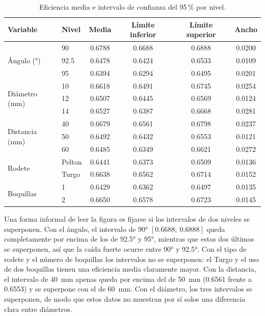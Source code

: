\begin{table}[H]
\centering
\caption{Eficiencia media e intervalo de confianza del 95\,\% por nivel.}
\label{tab:ic}
\begin{tabular}{llcccc}
\toprule
Variable & Nivel & Media & Límite inferior & Límite superior & Ancho \\
\midrule
\multirow{3}{*}{Ángulo (°)}     & 90     & 0.6788 & 0.6688 & 0.6888 & 0.0200 \\
                                & 92.5   & 0.6478 & 0.6424 & 0.6533 & 0.0109 \\
                                & 95     & 0.6394 & 0.6294 & 0.6495 & 0.0201 \\
\midrule
\multirow{3}{*}{Diámetro (mm)}  & 10     & 0.6618 & 0.6491 & 0.6745 & 0.0254 \\
                                & 12     & 0.6507 & 0.6445 & 0.6569 & 0.0124 \\
                                & 14     & 0.6527 & 0.6387 & 0.6668 & 0.0281 \\
\midrule
\multirow{3}{*}{Distancia (mm)} & 40     & 0.6679 & 0.6561 & 0.6798 & 0.0237 \\
                                & 50     & 0.6492 & 0.6432 & 0.6553 & 0.0121 \\
                                & 60     & 0.6485 & 0.6349 & 0.6621 & 0.0272 \\
\midrule
\multirow{2}{*}{Rodete}         & Pelton & 0.6441 & 0.6373 & 0.6509 & 0.0136 \\
                                & Turgo  & 0.6638 & 0.6562 & 0.6714 & 0.0152 \\
\midrule
\multirow{2}{*}{Boquillas}      & 1      & 0.6429 & 0.6362 & 0.6497 & 0.0135 \\
                                & 2      & 0.6650 & 0.6578 & 0.6723 & 0.0145 \\
\bottomrule
\end{tabular}
\end{table}

Una forma informal de leer la figura es fijarse si los intervalos de dos niveles se superponen. Con el ángulo, el intervalo de 90° $[0.6688;\ 0.6888]$ queda completamente por encima de los de 92.5° y 95°, mientras que estos dos últimos se superponen, así que la caída fuerte ocurre entre 90° y 92.5°. Con el tipo de rodete y el número de boquillas los intervalos no se superponen: el Turgo y el uso de dos boquillas tienen una eficiencia media claramente mayor. Con la distancia, el intervalo de 40~mm apenas queda por encima del de 50~mm (0.6561 frente a 0.6553) y se superpone con el de 60~mm. Con el diámetro, los tres intervalos se superponen, de modo que estos datos no muestran por sí solos una diferencia clara entre diámetros.

